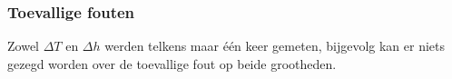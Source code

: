 \subsubsection{Toevallige fouten}


Zowel $\Delta T$ en $\Delta h$ werden telkens maar \'e\'en keer gemeten,
bijgevolg kan er niets gezegd worden over de toevallige fout op beide grootheden.
\\


